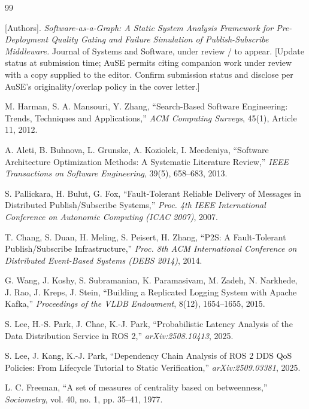 \documentclass[11pt]{article}
\begin{document}
\begin{thebibliography}{99}

 [Authors]. \emph{Software-as-a-Graph: A Static System Analysis Framework for
  Pre-Deployment Quality Gating and Failure Simulation of Publish-Subscribe Middleware.} Journal of
  Systems and Software, under review / to appear. [Update status at submission time; AuSE permits
  citing companion work under review with a copy supplied to the editor. Confirm submission status
  and disclose per AuSE's originality/overlap policy in the cover letter.]

 M. Harman, S. A. Mansouri, Y. Zhang, ``Search-Based Software Engineering: Trends,
  Techniques and Applications,'' \emph{ACM Computing Surveys}, 45(1), Article 11, 2012.

 A. Aleti, B. Buhnova, L. Grunske, A. Koziolek, I. Meedeniya, ``Software
  Architecture Optimization Methods: A Systematic Literature Review,'' \emph{IEEE Transactions on
  Software Engineering}, 39(5), 658--683, 2013.

 S. Pallickara, H. Bulut, G. Fox, ``Fault-Tolerant Reliable Delivery of
  Messages in Distributed Publish/Subscribe Systems,'' \emph{Proc. 4th IEEE International Conference
  on Autonomic Computing (ICAC 2007)}, 2007.

 T. Chang, S. Duan, H. Meling, S. Peisert, H. Zhang, ``P2S: A Fault-Tolerant
  Publish/Subscribe Infrastructure,'' \emph{Proc. 8th ACM International Conference on Distributed
  Event-Based Systems (DEBS 2014)}, 2014.

 G. Wang, J. Koshy, S. Subramanian, K. Paramasivam, M. Zadeh, N. Narkhede, J. Rao,
  J. Kreps, J. Stein, ``Building a Replicated Logging System with Apache Kafka,'' \emph{Proceedings of
  the VLDB Endowment}, 8(12), 1654--1655, 2015.

 S. Lee, H.-S. Park, J. Chae, K.-J. Park, ``Probabilistic Latency Analysis of
  the Data Distribution Service in ROS 2,'' \emph{arXiv:2508.10413}, 2025.

 S. Lee, J. Kang, K.-J. Park, ``Dependency Chain Analysis of ROS 2 DDS QoS
  Policies: From Lifecycle Tutorial to Static Verification,'' \emph{arXiv:2509.03381}, 2025.

 L. C. Freeman, ``A set of measures of centrality based on betweenness,''
  \emph{Sociometry}, vol. 40, no. 1, pp. 35--41, 1977.


\end{thebibliography}
\end{document}
